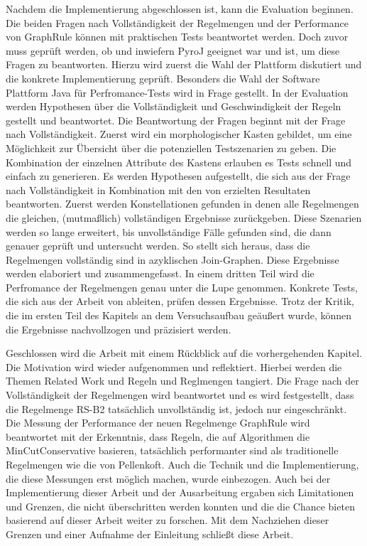 Nachdem die Implementierung abgeschlossen ist, kann die Evaluation beginnen. Die beiden Fragen nach Vollständigkeit der Regelmengen und der Performance von GraphRule können mit praktischen Tests beantwortet werden. Doch zuvor muss geprüft werden, ob und inwiefern PyroJ geeignet war und ist, um diese Fragen zu beantworten. Hierzu wird zuerst die Wahl  der Plattform diskutiert und die konkrete Implementierung geprüft. Besonders die Wahl der Software Plattform Java für Perfromance-Tests wird in Frage gestellt. In der Evaluation werden Hypothesen über die Vollständigkeit und Geschwindigkeit der Regeln gestellt und beantwortet. Die Beantwortung der Fragen beginnt mit der Frage nach Vollständigkeit. Zuerst wird ein morphologischer Kasten gebildet, um eine Möglichkeit zur Übersicht über die potenziellen Testszenarien zu geben. Die Kombination der einzelnen Attribute des Kastens erlauben es Tests schnell und einfach zu generieren. Es werden Hypothesen aufgestellt, die sich aus der Frage nach Vollständigkeit in Kombination mit den von \cite{shanbhag2014optimizing} erzielten Resultaten  beantworten. Zuerst werden Konstellationen gefunden in denen alle Regelmengen die gleichen, (mutmaßlich) vollständigen Ergebnisse zurückgeben. Diese Szenarien werden so lange erweitert, bis unvollständige Fälle gefunden sind, die dann genauer geprüft und untersucht werden. So stellt sich heraus, dass die Regelmengen vollständig sind in azyklischen Join-Graphen. Diese Ergebnisse werden elaboriert und zusammengefasst. In einem dritten Teil wird die Perfromance der Regelmengen genau unter die Lupe genommen. Konkrete Tests, die sich aus der Arbeit von \cite{shanbhag2014optimizing} ableiten, prüfen dessen Ergebnisse. Trotz der Kritik, die im ersten Teil des Kapitels an dem Versuchsaufbau geäußert wurde, können die Ergebnisse nachvollzogen und präzisiert werden.

Geschlossen wird die Arbeit mit einem Rückblick auf die vorhergehenden Kapitel. Die Motivation wird wieder aufgenommen und reflektiert. Hierbei werden die Themen Related Work und Regeln und Reglmengen tangiert. Die Frage nach der Vollständigkeit der Regelmengen wird beantwortet und es wird festgestellt, dass die Regelmenge RS-B2 tatsächlich unvollständig ist, jedoch nur eingeschränkt. Die Messung der Performance der neuen Regelmenge GraphRule wird beantwortet mit der Erkenntnis, dass Regeln, die auf Algorithmen die MinCutConservative basieren, tatsächlich performanter sind als traditionelle Regelmengen wie die von Pellenkoft. Auch die Technik und die Implementierung, die diese Messungen erst möglich machen, wurde einbezogen. Auch bei der Implementierung dieser Arbeit und der Ausarbeitung ergaben sich Limitationen und Grenzen, die nicht überschritten werden konnten und die die Chance bieten basierend auf dieser Arbeit weiter zu forschen. Mit dem Nachziehen dieser Grenzen und einer Aufnahme der Einleitung schließt diese Arbeit.